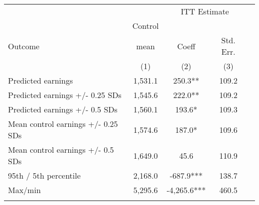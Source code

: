 \begin{tabular}{lcccc}
\hline \noalign{\smallskip} &  & \multicolumn{2}{c}{{ ITT Estimate}} & \\
\cline{3-4} & Control &  &  & \\
Outcome & mean & Coeff & Std. Err. & \\
 & (1) & (2) & (3) & \\
\noalign{\smallskip}\hline \noalign{\smallskip}Predicted earnings & 1,531.1 & 250.3** & 109.2 & \\
Predicted earnings +/- 0.25 SDs & 1,545.6 & 222.0** & 109.2 & \\
Predicted earnings +/- 0.5 SDs & 1,560.1 & 193.6* & 109.3 & \\
Mean control earnings +/- 0.25 SDs & 1,574.6 & 187.0* & 109.6 & \\
Mean control earnings +/- 0.5 SDs & 1,649.0 & 45.6 & 110.9 & \\
95th / 5th percentile & 2,168.0 & -687.9*** & 138.7 & \\
Max/min & 5,295.6 & -4,265.6*** & 460.5 & \\
\noalign{\smallskip}\hline\end{tabular}\\
